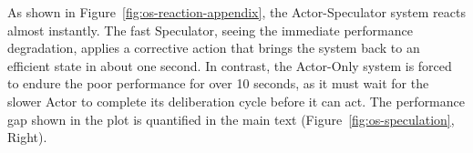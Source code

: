 As shown in Figure~\ref{fig:os-reaction-appendix}, the Actor-Speculator system reacts almost instantly. The fast Speculator, seeing the immediate performance degradation, applies a corrective action that brings the system back to an efficient state in about one second. In contrast, the Actor-Only system is forced to endure the poor performance for over 10 seconds, as it must wait for the slower Actor to complete its deliberation cycle before it can act.
The performance gap shown in the plot is quantified in the main text (Figure~\ref{fig:os-speculation}, Right).
